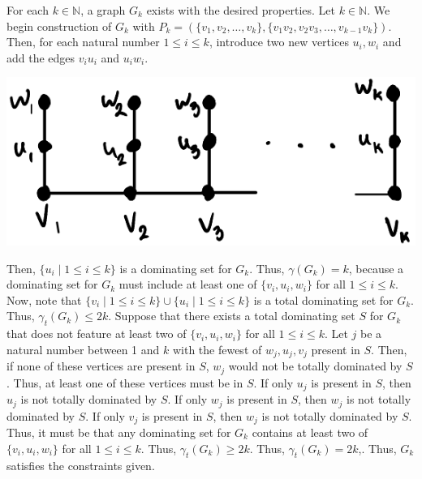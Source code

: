 \documentclass[12pt]{article}
\begin{document}
For each $k \in \mathbb N$, a graph $G_k$ exists with the desired properties.
Let $k \in \mathbb N$.
We begin construction of $G_k$ with $P_k = (\{v_1, v_2, \hdots, v_k\}, \{v_1v_2, v_2v_3, \hdots, v_{k-1}v_k\})$.
Then, for each natural number $1 \leq i \leq k$, introduce two new vertices $u_i, w_i$ and add the edges $v_iu_i$ and $u_iw_i$.
\begin{center} \includegraphics{12.png} \end{center}
Then, $\{u_i \mid 1 \leq i \leq k\}$ is a dominating set for $G_k$.
Thus, $\gamma(G_k) = k$, because a dominating set for $G_k$ must include at least one of $\{v_i, u_i, w_i\}$ for all $1 \leq i \leq k$.
Now, note that $\{v_i \mid 1 \leq i \leq k\} \cup \{u_i \mid 1 \leq i \leq k\}$ is a total dominating set for $G_k$.
Thus, $\gamma_t(G_k) \leq 2k$.
Suppose that there exists a total dominating set $S$ for $G_k$ that does not feature at least two of $\{v_i, u_i, w_i\}$ for all $1 \leq i \leq k$.
Let $j$ be a natural number between 1 and $k$ with the fewest of $w_j, u_j, v_j$ present in $S$.
Then, if none of these vertices are present in $S$, $w_j$ would not be totally dominated by $S$.
Thus, at least one of these vertices must be in $S$.
If only $u_j$ is present in $S$, then $u_j$ is not totally dominated by $S$.
If only $w_j$ is present in $S$, then $w_j$ is not totally dominated by $S$.
If only $v_j$ is present in $S$, then $w_j$ is not totally dominated by $S$.
Thus, it must be that any dominating set for $G_k$ contains at least two of $\{v_i, u_i, w_i\}$ for all $1 \leq i \leq k$.
Thus, $\gamma_t(G_k) \geq 2k$.
Thus, $\gamma_t(G_k) = 2k$,.
Thus, $G_k$ satisfies the constraints given.
\end{document}
